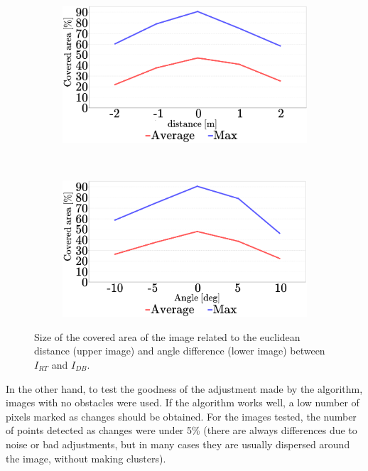 \begin{figure}[t]
\centering
  \begin{subfigure}[b]{0.45\textwidth}
  \centering
    \includegraphics[width=\textwidth]{distance_vs_area}\label{fig:cp01_distance_vs_area}
  \end{subfigure}%
  ~
  \begin{subfigure}[b]{0.45\textwidth}
    \centering
    \includegraphics[width=\textwidth]{angle_vs_area}\label{fig:cp01_angle_vs_area}
  \end{subfigure}%
  \caption{Size of the covered area of the image related to the euclidean distance (upper image) and angle difference (lower image) between $I_{RT}$ and $I_{DB}$.}\label{fig:cp01_area_covered}
\end{figure}

In the other hand, to test the goodness of the adjustment made by the algorithm, images with no obstacles were used. If the algorithm works well, a low number of pixels marked as changes should be obtained. For the images tested, the number of points detected as changes were under 5\% (there are always differences due to noise or bad adjustments, but in many cases they are usually dispersed around the image, without making clusters).

